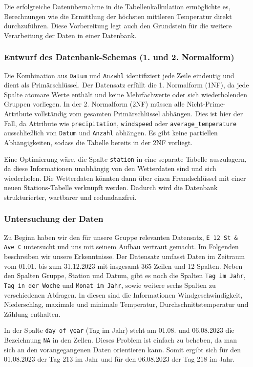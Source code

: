 \documentclass[a4paper,12pt]{article}
\begin{document}
Die erfolgreiche Datenübernahme in die Tabellenkalkulation ermöglichte es, Berechnungen wie die Ermittlung der höchsten mittleren Temperatur direkt durchzuführen. Diese Vorbereitung legt auch den Grundstein für die weitere Verarbeitung der Daten in einer Datenbank.

\subsubsection{Entwurf des Datenbank-Schemas (1. und 2. Normalform)}
Die Kombination aus \texttt{Datum} und \texttt{Anzahl} identifiziert jede Zeile eindeutig und dient als Primärschlüssel. Der Datensatz erfüllt die 1. Normalform (1NF), da jede Spalte atomare Werte enthält und keine Mehrfachwerte oder sich wiederholenden Gruppen vorliegen. In der 2. Normalform (2NF) müssen alle Nicht-Prime-Attribute vollständig vom gesamten Primärschlüssel abhängen. Dies ist hier der Fall, da Attribute wie \texttt{precipitation}, \texttt{windspeed} oder \texttt{average\_temperature} ausschließlich von \texttt{Datum} und \texttt{Anzahl} abhängen. Es gibt keine partiellen Abhängigkeiten, sodass die Tabelle bereits in der 2NF vorliegt.

Eine Optimierung wäre, die Spalte \texttt{station} in eine separate Tabelle auszulagern, da diese Informationen unabhängig von den Wetterdaten sind und sich wiederholen. Die Wetterdaten könnten dann über einen Fremdschlüssel mit einer neuen Stations-Tabelle verknüpft werden. Dadurch wird die Datenbank strukturierter, wartbarer und redundanzfrei.

\subsubsection{Untersuchung der Daten}
Zu Beginn haben wir den für unsere Gruppe relevanten Datensatz, \texttt{E 12 St \& Ave C} untersucht und uns mit seinem Aufbau vertraut gemacht. Im Folgenden beschreiben wir unsere Erkenntnisse. Der Datensatz umfasst Daten im Zeitraum vom 01.01. bis zum 31.12.2023 mit insgesamt 365 Zeilen und 12 Spalten. Neben den Spalten Gruppe, Station und Datum, gibt es noch die Spalten \texttt{Tag im Jahr}, \texttt{Tag in der Woche} und \texttt{Monat im Jahr}, sowie weitere sechs Spalten zu verschiedenen Abfragen. In diesen sind die Informationen Windgeschwindigkeit, Niederschlag, maximale und minimale Temperatur, Durchschnittstemperatur und Zählung enthalten. 

In der Spalte \texttt{day\_of\_year} (Tag im Jahr) steht am 01.08. und 06.08.2023 die Bezeichnung \texttt{NA} in den Zellen. Dieses Problem ist einfach zu beheben, da man sich an den vorangegangenen Daten orientieren kann. Somit ergibt sich für den 01.08.2023 der Tag 213 im Jahr und für den 06.08.2023 der Tag 218 im Jahr.
\end{document}
